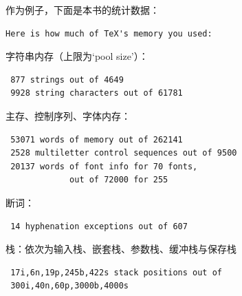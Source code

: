 \documentclass[a4paper]{rapport3}
\makeatletter
\def\cstoidx#1\par{\index{#1@\cs{#1}}}
\makeatother
\begin{document}
作为例子，下面是本书的统计数据：
\begin{verbatim}
Here is how much of TeX's memory you used:
\end{verbatim}
字符串内存（上限为`pool size'）：
\begin{verbatim}
 877 strings out of 4649
 9928 string characters out of 61781
\end{verbatim}
主存、控制序列、字体内存：
\begin{verbatim}
 53071 words of memory out of 262141
 2528 multiletter control sequences out of 9500
 20137 words of font info for 70 fonts,
             out of 72000 for 255
\end{verbatim}
断词：
\begin{verbatim}
 14 hyphenation exceptions out of 607
\end{verbatim}
栈：依次为输入栈、嵌套栈、参数栈、缓冲栈与保存栈
\begin{verbatim}
 17i,6n,19p,245b,422s stack positions out of 
 300i,40n,60p,3000b,4000s
\end{verbatim}




\end{document}
